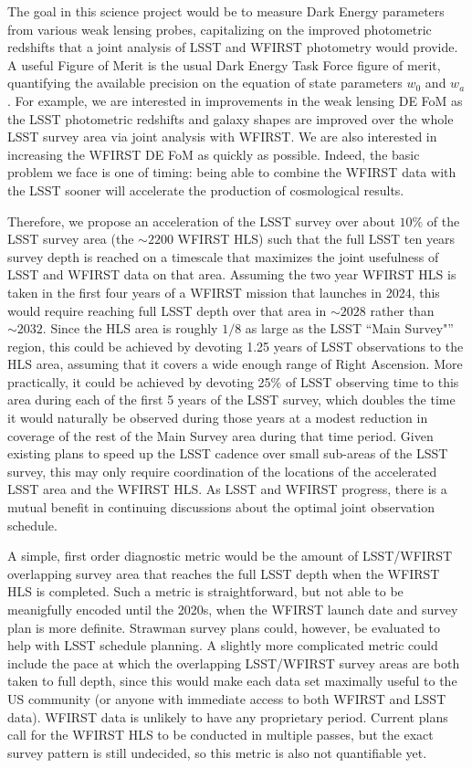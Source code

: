 The goal in this science project would be to measure Dark Energy parameters from various weak lensing
probes, capitalizing on the improved photometric redshifts that a joint
analysis of LSST and WFIRST photometry would provide. A useful
Figure of Merit is the usual Dark Energy Task Force figure of merit,
quantifying the available precision on the equation of state
parameters $w_0$ and $w_a$. For example, we are interested in
improvements in the weak lensing DE FoM as the LSST photometric redshifts
and galaxy shapes are improved over the whole LSST survey area
via joint analysis with WFIRST. We are also interested in increasing the
WFIRST DE FoM as quickly as possible.
Indeed, the basic problem we face is one of timing: being able to combine
the WFIRST data with the LSST sooner will accelerate the production of
cosmological results.

Therefore, we propose an acceleration of the LSST survey over about $10\%$ of the
LSST survey area (the $\sim2200$ WFIRST HLS) such that the full LSST ten
years survey depth is reached on a timescale that maximizes the joint
usefulness of LSST and WFIRST data on that area.  Assuming the two year
WFIRST HLS is taken in the first four years of a WFIRST mission that
launches in 2024, this would require reaching full LSST depth over that
area in $\sim2028$ rather than $\sim2032$. Since the HLS area is roughly
$1/8$ as large as the LSST ``Main Survey"'' region, this could be
achieved by devoting 1.25 years of LSST observations to the HLS area,
assuming that it covers a wide enough range of Right Ascension.  More
practically, it could be achieved by devoting 25\% of LSST observing
time to this area during each of the first 5 years of the LSST survey,
which doubles the time it would naturally be observed during those years
at a modest reduction in coverage of the rest of the Main Survey area
during that time period.   Given existing plans to speed up the LSST
cadence over small sub-areas of the LSST survey, this may only require
coordination of the locations of the accelerated LSST area and the
WFIRST HLS. As LSST and WFIRST progress, there is a mutual benefit in
continuing discussions about the optimal joint observation schedule.


A simple, first order diagnostic metric would be the amount of LSST/WFIRST
overlapping survey area that reaches the full LSST depth when the WFIRST
HLS is completed.  Such a metric is straightforward, but not
able to be meanigfully encoded until the 2020s, when the WFIRST launch date and survey
plan is more definite.  Strawman survey plans could, however, be
evaluated to help with LSST schedule planning.
A slightly more complicated metric could include
the pace at which the overlapping LSST/WFIRST survey areas are both
taken to full depth, since this would make each data set maximally
useful to the US community (or anyone with immediate access to both
WFIRST and LSST data).  WFIRST data is unlikely to have any proprietary
period.  Current plans call for the WFIRST HLS to be conducted in
multiple passes, but the exact survey pattern is still undecided, so this
metric is also not quantifiable yet.

